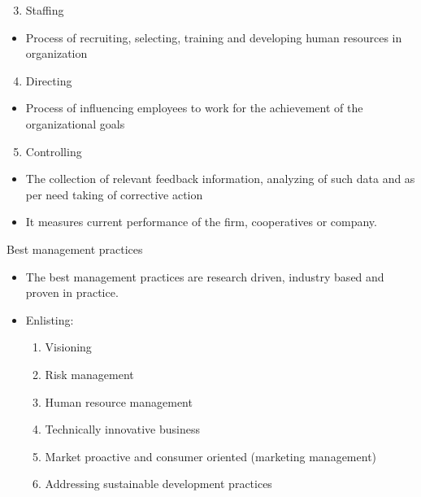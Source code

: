 \documentclass[12pt,ignorenonframetext,aspectratio=169]{beamer}
\providecommand{\tightlist}{%
  \setlength{\itemsep}{0pt}\setlength{\parskip}{0pt}}
\begin{document}
\begin{frame}{}
\protect\hypertarget{section-2}{}
\begin{enumerate}
\setcounter{enumi}{2}
\tightlist
\item
  Staffing
\end{enumerate}

\begin{itemize}
\tightlist
\item
  Process of recruiting, selecting, training and developing human
  resources in organization
\end{itemize}

\begin{enumerate}
\setcounter{enumi}{3}
\tightlist
\item
  Directing
\end{enumerate}

\begin{itemize}
\tightlist
\item
  Process of influencing employees to work for the achievement of the
  organizational goals
\end{itemize}

\begin{enumerate}
\setcounter{enumi}{4}
\tightlist
\item
  Controlling
\end{enumerate}

\begin{itemize}
\tightlist
\item
  The collection of relevant feedback information, analyzing of such
  data and as per need taking of corrective action
\item
  It measures current performance of the firm, cooperatives or company.
\end{itemize}
\end{frame}

\begin{frame}{Best management practices}
\protect\hypertarget{best-management-practices}{}
\begin{itemize}
\tightlist
\item
  The best management practices are research driven, industry based and
  proven in practice.
\item
  Enlisting:

  \begin{enumerate}
  \tightlist
  \item
    Visioning
  \item
    Risk management
  \item
    Human resource management
  \item
    Technically innovative business
  \item
    Market proactive and consumer oriented (marketing management)
  \item
    Addressing sustainable development practices
  \end{enumerate}
\end{itemize}
\end{frame}
\end{document}
